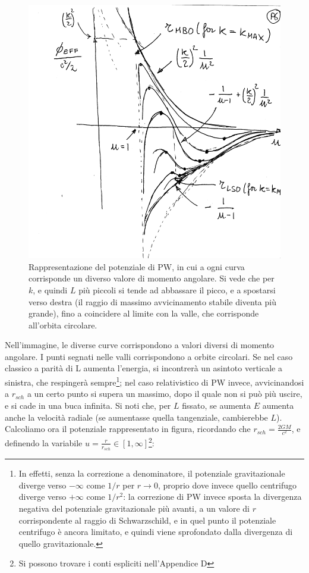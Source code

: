 \begin{figure}[h!]
    \centering
    \includegraphics[width=0.7\linewidth]{Immagini/potenziale_PW.png}
    \caption{Rappresentazione del potenziale di PW, in cui a ogni curva corrisponde un diverso valore di momento angolare. Si vede che per $k$, e quindi $L$ più piccoli si tende ad abbassare il picco, e a spostarsi verso destra (il raggio di massimo avvicinamento stabile diventa più grande), fino a coincidere al limite con la valle, che corrisponde all'orbita circolare.}
    \label{fig:pw potential}
\end{figure}
Nell'immagine, le diverse curve corrispondono a valori diversi di momento angolare. 
I punti segnati nelle valli corrispondono a orbite circolari.
Se nel caso classico a parità di L aumenta l'energia, si incontrerà un asintoto verticale a sinistra, che respingerà sempre\footnote{In effetti, senza la correzione a denominatore, il potenziale gravitazionale diverge verso $-\infty$ come $1/r$ per $r\xrightarrow{}0$, proprio dove invece quello centrifugo diverge verso $+\infty$ come $1/r^2$: la correzione di PW invece sposta la divergenza negativa del potenziale gravitazionale più avanti, a un valore di $r$ corrispondente al raggio di Schwarzschild, e in quel punto il potenziale centrifugo è ancora limitato, e quindi viene sprofondato dalla divergenza di quello gravitazionale.}; nel caso relativistico di PW invece, avvicinandosi a $r_{sch}$ a un certo punto si supera un massimo, dopo il quale non si può più uscire, e si cade in una buca infinita.
Si noti che, per $L$ fissato, se aumenta $E$ aumenta anche la velocità radiale (se aumentasse quella tangenziale, cambierebbe $L$).
Calcoliamo ora il potenziale rappresentato in figura, ricordando che $r_{sch} = \frac{2GM}{c^2}$, e definendo la variabile $u=\frac{r}{r_{sch}} \in [1, \infty]$\footnote{Si possono trovare i conti espliciti nell'Appendice D}:
